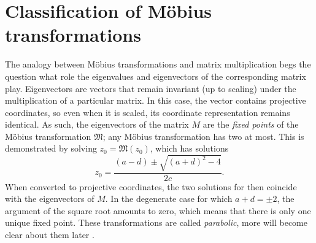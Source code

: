 \section{Classification of Möbius transformations}
\label{sec:classification}
The analogy between Möbius transformations and matrix multiplication begs the question  what role the eigenvalues and eigenvectors of the corresponding matrix play. Eigenvectors are vectors that remain invariant (up to scaling) under the multiplication of a particular matrix. In this case, the vector contains projective coordinates, so even when it is scaled, its coordinate representation remains identical. As such, the eigenvectors of the matrix \(M\) are the \emph{fixed points} of the Möbius transformation \(\mathfrak{M}\); any Möbius transformation has two at most. This is demonstrated by solving \(z_0 = \mathfrak{M}(z_0)\), which has solutions
\[ z_0 = \frac{(a - d) \pm \sqrt{(a + d)^2 - 4}}{2c}.\]
When converted to projective coordinates, the two solutions for  then coincide with the eigenvectors of \(M\). In the degenerate case for which \(a + d = \pm2\), the argument of the square root amounts to zero, which means that there is only one unique fixed point. These transformations are called \emph{parabolic}, more will become clear about them later \cite{Needham1997}.

